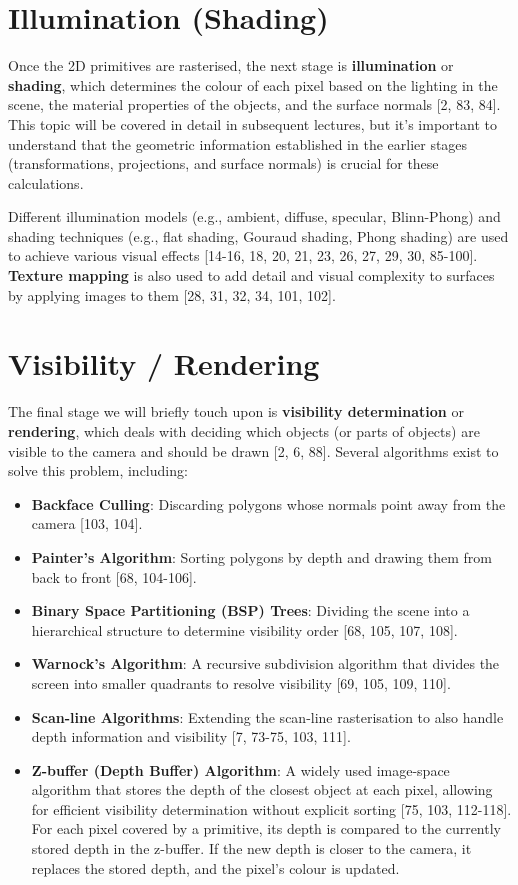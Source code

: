 \documentclass[12pt]{article}
\begin{document}
\section{Illumination (Shading)}

Once the 2D primitives are rasterised, the next stage is \textbf{illumination} or \textbf{shading}, which determines the colour of each pixel based on the lighting in the scene, the material properties of the objects, and the surface normals [2, 83, 84]. This topic will be covered in detail in subsequent lectures, but it's important to understand that the geometric information established in the earlier stages (transformations, projections, and surface normals) is crucial for these calculations.

Different illumination models (e.g., ambient, diffuse, specular, Blinn-Phong) and shading techniques (e.g., flat shading, Gouraud shading, Phong shading) are used to achieve various visual effects [14-16, 18, 20, 21, 23, 26, 27, 29, 30, 85-100]. \textbf{Texture mapping} is also used to add detail and visual complexity to surfaces by applying images to them [28, 31, 32, 34, 101, 102].

\section{Visibility / Rendering}

The final stage we will briefly touch upon is \textbf{visibility determination} or \textbf{rendering}, which deals with deciding which objects (or parts of objects) are visible to the camera and should be drawn [2, 6, 88]. Several algorithms exist to solve this problem, including:

\begin{itemize}
    \item \textbf{Backface Culling}: Discarding polygons whose normals point away from the camera [103, 104].
    \item \textbf{Painter's Algorithm}: Sorting polygons by depth and drawing them from back to front [68, 104-106].
    \item \textbf{Binary Space Partitioning (BSP) Trees}: Dividing the scene into a hierarchical structure to determine visibility order [68, 105, 107, 108].
    \item \textbf{Warnock's Algorithm}: A recursive subdivision algorithm that divides the screen into smaller quadrants to resolve visibility [69, 105, 109, 110].
    \item \textbf{Scan-line Algorithms}: Extending the scan-line rasterisation to also handle depth information and visibility [7, 73-75, 103, 111].
    \item \textbf{Z-buffer (Depth Buffer) Algorithm}: A widely used image-space algorithm that stores the depth of the closest object at each pixel, allowing for efficient visibility determination without explicit sorting [75, 103, 112-118]. For each pixel covered by a primitive, its depth is compared to the currently stored depth in the z-buffer. If the new depth is closer to the camera, it replaces the stored depth, and the pixel's colour is updated.
\end{itemize}
\end{document}
